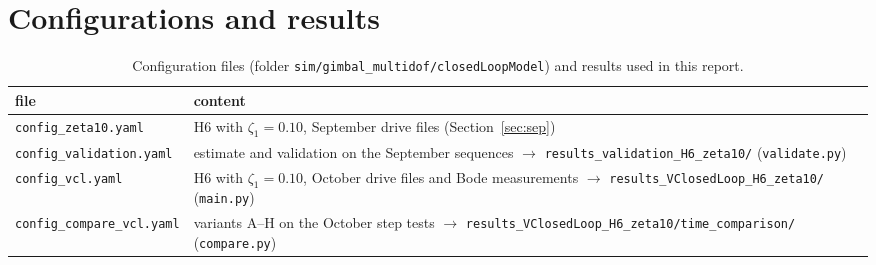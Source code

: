 \documentclass[10pt,a4paper]{article}
\numberwithin{equation}{section}
\begin{document}
\section{Configurations and results}
\begin{table}[H]\centering\small
\caption{Configuration files (folder \texttt{sim/gimbal\_multidof/closedLoopModel}) and results used in this report.}
\begin{tabularx}{\linewidth}{lY}\toprule
file & content \\ \midrule
\texttt{config\_zeta10.yaml} & H6 with $\zeta_1=0.10$, September drive files (Section~\ref{sec:sep}) \\
\texttt{config\_validation.yaml} & estimate and validation on the September sequences $\to$ \texttt{results\_validation\_H6\_zeta10/} (\texttt{validate.py}) \\
\texttt{config\_vcl.yaml} & H6 with $\zeta_1=0.10$, October drive files and Bode measurements $\to$ \texttt{results\_VClosedLoop\_H6\_zeta10/} (\texttt{main.py}) \\
\texttt{config\_compare\_vcl.yaml} & variants A--H on the October step tests $\to$ \texttt{results\_VClosedLoop\_H6\_zeta10/time\_comparison/} (\texttt{compare.py}) \\ \bottomrule
\end{tabularx}\end{table}
\end{document}
